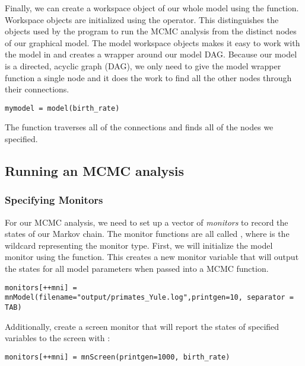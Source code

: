 Finally, we can create a workspace object of our whole model using the  function.
Workspace objects are initialized using the \cl{=} operator. This distinguishes the objects used by the program to run the MCMC analysis from the distinct nodes of our graphical model.
The model workspace objects makes it easy to work with the model in \Rev and creates a wrapper around our model DAG.
Because our model is a directed, acyclic graph (DAG), we only need to give the model wrapper function a single node and it does the work to find all the other nodes through their connections.
{\tt \begin{snugshade*}
\begin{lstlisting}
mymodel = model(birth_rate)
\end{lstlisting}
\end{snugshade*}}

The  function traverses all of the connections and finds all of the nodes we specified.


\subsection{Running an MCMC analysis}

\subsubsection{Specifying Monitors}

For our MCMC analysis, we need to set up a vector of \textit{monitors} to record the states of our Markov chain.
The monitor functions are all called , where \cl{*} is the wildcard representing the monitor type.
First, we will initialize the model monitor using the  function. This creates a new monitor variable that will output the states for all model parameters when passed into a MCMC function.
{\tt \begin{snugshade*}
\begin{lstlisting}
monitors[++mni] = mnModel(filename="output/primates_Yule.log",printgen=10, separator = TAB)
\end{lstlisting}
\end{snugshade*}}

Additionally, create a screen monitor that will report the states of specified variables to the screen with :
{\tt \begin{snugshade*}
\begin{lstlisting}
monitors[++mni] = mnScreen(printgen=1000, birth_rate)
\end{lstlisting}
\end{snugshade*}}

